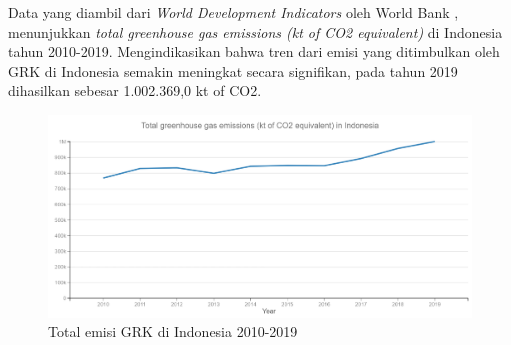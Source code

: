 \label{lampiran}

Data yang diambil dari \textit{World Development Indicators} oleh World Bank \cite{worldbank_2023}, menunjukkan \textit{total greenhouse gas emissions (kt of CO2 equivalent)} di Indonesia tahun 2010-2019. Mengindikasikan bahwa tren dari emisi yang ditimbulkan oleh GRK di Indonesia semakin meningkat secara signifikan, pada tahun 2019 dihasilkan sebesar 1.002.369,0 kt of CO2.
\begin{figure}[H]
    \centering
    \includegraphics[width=0.9\linewidth]{img/L1.png}
    \caption{Total emisi GRK di Indonesia 2010-2019}
    \label{fig:L1}
\end{figure}

